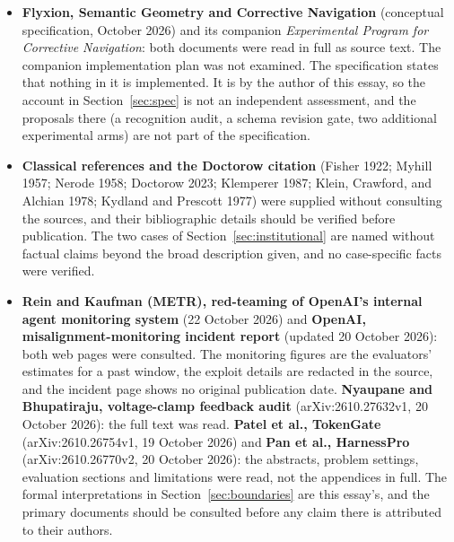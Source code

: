 \documentclass[11pt]{article}
\theoremstyle{definition}
\theoremstyle{remark}
\begin{document}
\begin{itemize}
\item \textbf{Flyxion, Semantic Geometry and Corrective Navigation} (conceptual specification, October 2026) and its companion \emph{Experimental Program for Corrective Navigation}: both documents were read in full as source text. The companion implementation plan was not examined. The specification states that nothing in it is implemented. It is by the author of this essay, so the account in Section~\ref{sec:spec} is not an independent assessment, and the proposals there (a recognition audit, a schema revision gate, two additional experimental arms) are not part of the specification.
\item \textbf{Classical references and the Doctorow citation} (Fisher 1922; Myhill 1957; Nerode 1958; Doctorow 2023; Klemperer 1987; Klein, Crawford, and Alchian 1978; Kydland and Prescott 1977) were supplied without consulting the sources, and their bibliographic details should be verified before publication. The two cases of Section~\ref{sec:institutional} are named without factual claims beyond the broad description given, and no case-specific facts were verified.
\item \textbf{Rein and Kaufman (METR), red-teaming of OpenAI's internal agent monitoring system} (22 October 2026) and \textbf{OpenAI, misalignment-monitoring incident report} (updated 20 October 2026): both web pages were consulted. The monitoring figures are the evaluators' estimates for a past window, the exploit details are redacted in the source, and the incident page shows no original publication date. \textbf{Nyaupane and Bhupatiraju, voltage-clamp feedback audit} (arXiv:2610.27632v1, 20 October 2026): the full text was read. \textbf{Patel et al., TokenGate} (arXiv:2610.26754v1, 19 October 2026) and \textbf{Pan et al., HarnessPro} (arXiv:2610.26770v2, 20 October 2026): the abstracts, problem settings, evaluation sections and limitations were read, not the appendices in full. The formal interpretations in Section~\ref{sec:boundaries} are this essay's, and the primary documents should be consulted before any claim there is attributed to their authors.
\end{itemize}
\end{document}
